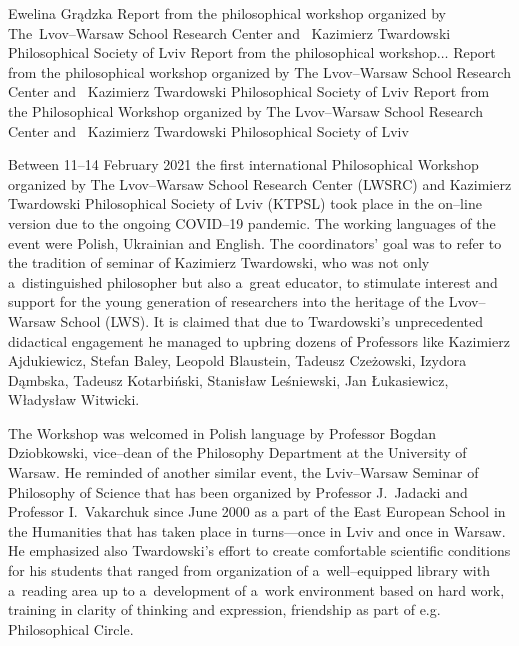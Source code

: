 \begin{editorialeng}{Ewelina Grądzka}
	{Report from the philosophical workshop organized by The~Lvov--Warsaw School Research Center and ~Kazimierz Twardowski Philosophical Society of Lviv}
	{Report from the philosophical workshop$\ldots$}
	{Report from the philosophical workshop organized by The Lvov--Warsaw School Research Center and ~Kazimierz Twardowski Philosophical Society of Lviv}
	{Report from the Philosophical Workshop organized by The Lvov--Warsaw School Research Center and ~Kazimierz Twardowski Philosophical Society of Lviv}



\lettrine[loversize=0.13,lines=2,lraise=-0.03,nindent=0em,findent=0.2pt]%
{B}{}etween 11--14 February 2021 the first international Philosophical Workshop organized by The Lvov--Warsaw School Research Center (LWSRC) and Kazimierz Twardowski Philosophical Society of Lviv (KTPSL) took place in the on--line version due to the ongoing COVID--19 pandemic. The working languages of the event were Polish, Ukrainian and English. The coordinators’ goal was to refer to the tradition of seminar of Kazimierz Twardowski, who was not only a~distinguished philosopher but also a~great educator, to stimulate interest and support for the young generation of researchers into the heritage of the Lvov--Warsaw School (LWS). It is claimed that due to Twardowski’s unprecedented didactical engagement he managed to upbring dozens of Professors like Kazimierz Ajdukiewicz, Stefan Baley, Leopold Blaustein, Tadeusz Czeżowski, Izydora Dąmbska, Tadeusz Kotarbiński, Stanisław Leśniewski, Jan Łukasiewicz, Władysław Witwicki.

The Workshop was welcomed in Polish language by Professor Bogdan Dziobkowski, vice--dean of the Philosophy Department at the University of Warsaw. He reminded of another similar event, the Lviv--Warsaw Seminar of Philosophy of Science that has been organized by Professor J.~Jadacki and Professor I.~Vakarchuk since June 2000 as a part of the East European School in the Humanities that has taken place in turns---once in Lviv and once in Warsaw. He emphasized also Twardowski’s effort to create comfortable scientific conditions for his students that ranged from organization of a~well--equipped library with a~reading area up to a~development of a~work environment based on hard work, training in clarity of thinking and expression, friendship as part of e.g. Philosophical Circle.


\end{editorialeng}
